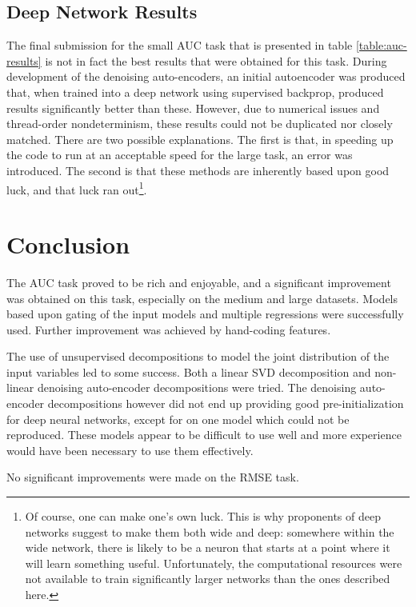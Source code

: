 \documentclass{article}
\begin{document}
\subsection{Deep Network Results}

The final submission for the small AUC task that is presented in table \ref{table:auc-results} is not in fact the best results that were obtained for this task.  During development of the denoising auto-encoders, an initial autoencoder was produced that, when trained into a deep network using supervised backprop, produced results significantly better than these.  However, due to numerical issues and thread-order nondeterminism, these results could not be duplicated nor closely matched.  There are two possible explanations.  The first is that, in speeding up the code to run at an acceptable speed for the large task, an error was introduced.  The second is that these methods are inherently based upon good luck, and that luck ran out\footnote{Of course, one can make one's own luck.  This is why proponents of deep networks suggest to make them both wide and deep: somewhere within the wide network, there is likely to be a neuron that starts at a point where it will learn something useful.  Unfortunately, the computational resources were not available to train significantly larger networks than the ones described here.}.

\section{Conclusion}

The AUC task proved to be rich and enjoyable, and a significant improvement was obtained on this task, especially on the medium and large datasets.  Models based upon gating of the input models and multiple regressions were successfully used.  Further improvement was achieved by hand-coding features.

The use of unsupervised decompositions to model the joint distribution of the input variables led to some success.  Both a linear SVD decomposition and non-linear denoising auto-encoder decompositions were tried.  The denoising auto-encoder decompositions however did not end up providing good pre-initialization for deep neural networks, except for on one model which could not be reproduced.  These models appear to be difficult to use well and more experience would have been necessary to use them effectively.

No significant improvements were made on the RMSE task.
\end{document}
